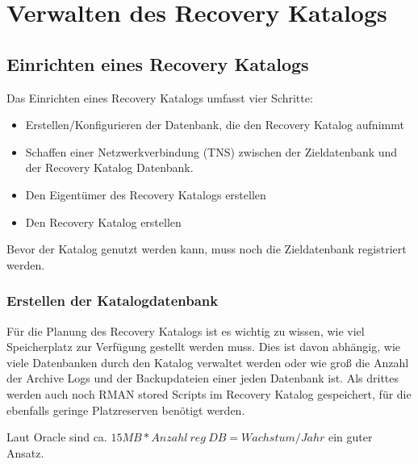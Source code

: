 \chapter{Verwalten des Recovery Katalogs}
\chaptertoc{}
\cleardoubleevenpage

    \section{Einrichten eines Recovery Katalogs}
    \label{createrecoverycatalog}
      Das Einrichten eines Recovery Katalogs umfasst vier Schritte:
      \begin{itemize}
        \item Erstellen/Konfigurieren der Datenbank, die den Recovery Katalog aufnimmt
        \item Schaffen einer Netzwerkverbindung (TNS) zwischen der Zieldatenbank und der Recovery Katalog Datenbank.
        \item Den Eigentümer des Recovery Katalogs erstellen
        \item Den Recovery Katalog erstellen
      \end{itemize}
      Bevor der Katalog genutzt werden kann, muss noch die Zieldatenbank registriert werden.
      \subsection{Erstellen der Katalogdatenbank}
        Für die Planung des Recovery Katalogs ist es wichtig zu wissen, wie viel Speicherplatz zur Verfügung gestellt werden muss. Dies ist davon abhängig, wie viele Datenbanken durch den Katalog verwaltet werden oder wie groß die Anzahl der Archive Logs und der Backupdateien einer jeden Datenbank ist. Als drittes werden auch noch RMAN stored Scripts im Recovery Katalog gespeichert, für die ebenfalls geringe Platzreserven benötigt werden.

        \begin{merke}
          Laut Oracle sind ca. $15 MB * Anzahl\ reg\ DB = Wachstum/Jahr$ ein guter Ansatz.
        \end{merke}


